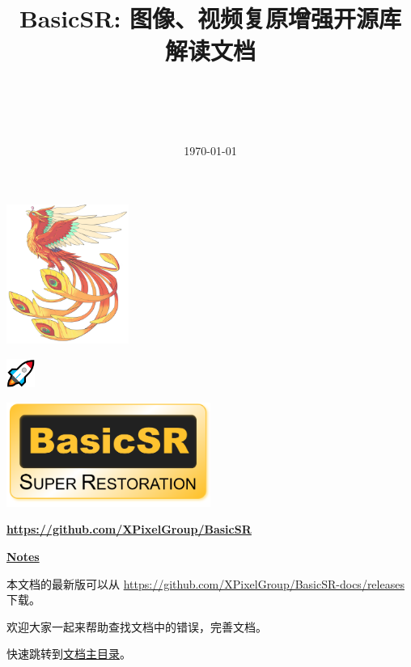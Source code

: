 \documentclass[a4paper, 12pt, oneside]{memoir}
\title{
    \vspace{4cm}
    \normalfont \normalsize
    \horrule{0.5pt} \\[0.4cm]
    \huge \begin{CJK}{UTF8}{gbsn} BasicSR: 图像、视频复原增强开源库
        \\ 解读文档\end{CJK}
    \horrule{2pt} \\[0.5cm]
}
\date{\normalsize\today}
\begin{document}
\maketitle
\thispagestyle{empty}

\vspace{-15.5cm}
\begin{adjustwidth}{0.5cm}{}
    \hspace{5.5cm}
    \includegraphics[width=0.3\textwidth]{figures/xpixel-logo.jpg}
\end{adjustwidth}
\vspace{1.2cm}
\begin{adjustwidth}{0.5cm}{}
    \includegraphics[width=0.07\textwidth]{figures/rocket_logo.png}
\end{adjustwidth}
\vspace{5cm}

\begin{center}
    \includegraphics[width=0.5\textwidth]{figures/basicsr_logo.png}
\end{center}
\begin{center}
    \underline{\textbf{\url{https://github.com/XPixelGroup/BasicSR}}}
\end{center}

\vspace{0.2cm}
\begin{center}
    \textcolor{ChadBlue}{\underline{\textbf{Notes}}}
\end{center}
\vspace{0.5cm}
\begin{CJK}{UTF8}{gbsn}

    本文档的最新版可以从 \url{https://github.com/XPixelGroup/BasicSR-docs/releases} 下载。

    欢迎大家一起来帮助查找文档中的错误，完善文档。

    快速跳转到\hyperref[toc]{文档主目录}。
\end{CJK}
\end{document}
